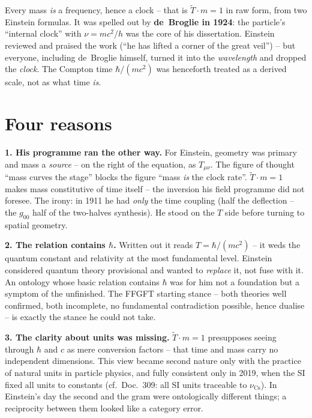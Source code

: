 Every mass \emph{is} a frequency, hence a clock -- that is
$\tilde T \cdot m = 1$ in raw form, from two Einstein formulas. It
was spelled out by \textbf{de~Broglie in 1924}: the particle's
\enquote{internal clock} with $\nu = mc^2/h$ was the core of his
dissertation. Einstein reviewed and praised the work
(\enquote{he has lifted a corner of the great veil}) -- but
everyone, including de~Broglie himself, turned it into the
\emph{wavelength} and dropped the \emph{clock}. The Compton time
$\hbar/(mc^2)$ was henceforth treated as a derived scale, not as
what time \emph{is}.

\section{Four reasons}

\textbf{1. His programme ran the other way.} For Einstein, geometry
was primary and mass a \emph{source} -- on the right of the
equation, as $T_{\mu\nu}$. The figure of thought \enquote{mass
curves the stage} blocks the figure \enquote{mass \emph{is} the
clock rate}. $\tilde T \cdot m = 1$ makes mass constitutive of time
itself -- the inversion his field programme did not foresee. The
irony: in 1911 he had \emph{only} the time coupling (half the
deflection -- the $g_{00}$ half of the two-halves synthesis). He
stood on the $T$ side before turning to spatial geometry.

\textbf{2. The relation contains $\hbar$.} Written out it reads
$T = \hbar/(mc^2)$ -- it weds the quantum constant and relativity
at the most fundamental level. Einstein considered quantum theory
provisional and wanted to \emph{replace} it, not fuse with it. An
ontology whose basic relation contains $\hbar$ was for him not a
foundation but a symptom of the unfinished. The FFGFT starting
stance -- both theories well confirmed, both incomplete, no
fundamental contradiction possible, hence dualise -- is exactly the
stance he could not take.

\textbf{3. The clarity about units was missing.}
$\tilde T \cdot m = 1$ presupposes seeing through $\hbar$ and $c$
as mere conversion factors -- that time and mass carry no
independent dimensions. This view became second nature only with
the practice of natural units in particle physics, and fully
consistent only in 2019, when the SI fixed all units to constants
(cf.\ Doc.~309: all SI units traceable to $\nu_\text{Cs}$). In
Einstein's day the second and the gram were ontologically different
things; a reciprocity between them looked like a category error.

